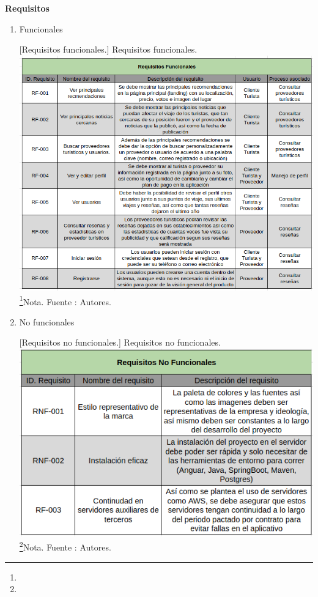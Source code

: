 \textbf{Requisitos}

\begin{enumerate}
    \item Funcionales
        \par\vspace{2mm}
        \begin{minipage}{0.9\textwidth}
        \centering
        [{Requisitos funcionales.}]{ Requisitos funcionales.}
        \label{req1}
        \includegraphics[width=1\textwidth]{Content/Images/requisitos.png}
        \footnote{}{Nota. \textup{Fuente : Autores.}}
        \end{minipage}
           
    \item No funcionales
    \par\vspace{2mm}
        \begin{minipage}{0.9\textwidth}
        \centering
        [{Requisitos no funcionales.}]{ Requisitos no funcionales.}
        \label{req1}
        \includegraphics[width=1\textwidth]{Content/Images/requisitosNF.png}
        \footnote{}{Nota. \textup{Fuente : Autores.}}
        \end{minipage}
        
\end{enumerate}

